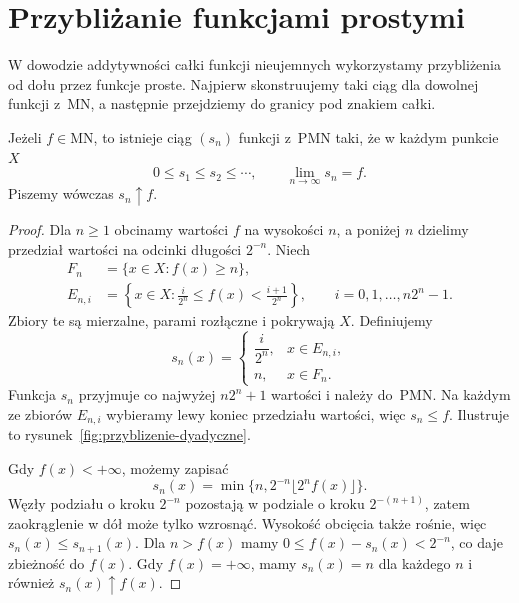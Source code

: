 
\section{Przybliżanie funkcjami prostymi}
\label{sec:przyblizanie-funkcjami-prostymi}

W dowodzie addytywności całki funkcji nieujemnych wykorzystamy
przybliżenia od dołu przez funkcje proste. Najpierw skonstruujemy taki
ciąg dla dowolnej funkcji z~$\mathrm{MN}$, a następnie przejdziemy
do granicy pod znakiem całki.

\begin{twierdzenie}
\label{tw:przyblizanie-funkcjami-prostymi}
Jeżeli $f\in\mathrm{MN}$, to istnieje ciąg $(s_n)$ funkcji
z~$\mathrm{PMN}$ taki, że w każdym punkcie $X$
\[
  0\leq s_1\leq s_2\leq\cdots,\qquad \lim_{n\to\infty}s_n=f.
\]
Piszemy wówczas $s_n\uparrow f$.
\end{twierdzenie}

\begin{proof}
Dla $n\geq1$ obcinamy wartości $f$ na wysokości $n$, a poniżej $n$
dzielimy przedział wartości na odcinki długości $2^{-n}$. Niech
\begin{align*}
  F_n&=\{x\in X:f(x)\geq n\},\\
  E_{n,i}&=\left\{x\in X:\frac{i}{2^n}\leq f(x)
               <\frac{i+1}{2^n}\right\},
               \qquad i=0,1,\ldots,n2^n-1.
\end{align*}
Zbiory te są mierzalne, parami rozłączne i pokrywają $X$. Definiujemy
\begin{equation}
  s_n(x)=
  \begin{cases}
    \dfrac{i}{2^n}, & x\in E_{n,i},\\[4pt]
    n, & x\in F_n.
  \end{cases}
  \label{eq:dyadyczne-przyblizenie}
\end{equation}
Funkcja $s_n$ przyjmuje co najwyżej $n2^n+1$ wartości i należy
do~$\mathrm{PMN}$. Na każdym ze zbiorów $E_{n,i}$ wybieramy lewy koniec
przedziału wartości, więc $s_n\leq f$. Ilustruje to
rysunek~\ref{fig:przyblizenie-dyadyczne}.

Gdy $f(x)<+\infty$, możemy zapisać
\[
  s_n(x)=\min\bigl\{n,2^{-n}\lfloor 2^n f(x)\rfloor\bigr\}.
\]
Węzły podziału o kroku $2^{-n}$ pozostają w podziale o kroku
$2^{-(n+1)}$, zatem zaokrąglenie w dół może tylko wzrosnąć. Wysokość
obcięcia także rośnie, więc $s_n(x)\leq s_{n+1}(x)$. Dla $n>f(x)$
mamy $0\leq f(x)-s_n(x)<2^{-n}$, co daje zbieżność do $f(x)$.
Gdy $f(x)=+\infty$, mamy $s_n(x)=n$ dla każdego $n$ i również
$s_n(x)\uparrow f(x)$.
\end{proof}

